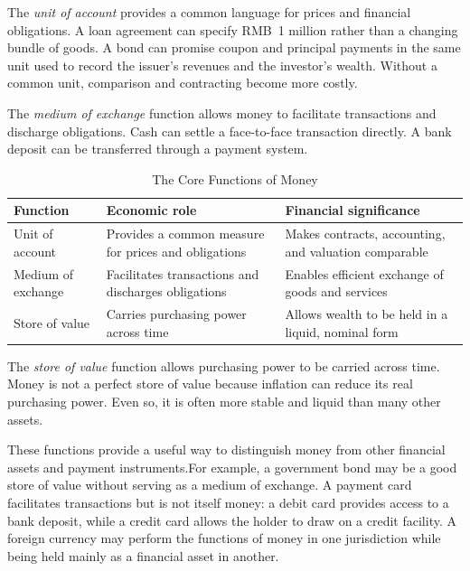 The \emph{unit of account} provides a common language for prices and financial obligations. A loan agreement can specify RMB~1 million rather than a changing bundle of goods. A bond can promise coupon and principal payments in the same unit used to record the issuer's revenues and the investor's wealth. Without a common unit, comparison and contracting become more costly.

The \emph{medium of exchange} function allows money to facilitate transactions and discharge obligations. Cash can settle a face-to-face transaction directly. A bank deposit can be transferred through a payment system. 


\begin{table}[H]
\centering
\caption{The Core Functions of Money}
\label{tab:ch2-money-functions}
\renewcommand{\arraystretch}{1.4}
\begin{tabularx}{\textwidth}{
    @{}
    >{\raggedright\arraybackslash}p{3.0cm}
    >{\raggedright\arraybackslash}X
    >{\raggedright\arraybackslash}X
    @{}
}
\toprule
\textbf{Function}
& \textbf{Economic role}
& \textbf{Financial significance} \\
\midrule

Unit of account
& Provides a common measure for prices and obligations
& Makes contracts, accounting, and valuation comparable \\

Medium of exchange
& Facilitates transactions and discharges obligations
& Enables efficient exchange of goods and services \\

Store of value
& Carries purchasing power across time
& Allows wealth to be held in a liquid, nominal form \\

\bottomrule
\end{tabularx}
\end{table}

The \emph{store of value} function allows purchasing power to be carried across time. Money is not a perfect store of value because inflation can reduce its real purchasing power. Even so, it is often more stable and liquid than many other assets. 

These functions provide a useful way to distinguish money from other financial assets and payment instruments.For example, a government bond may be a good store of value without serving as a medium of exchange. A payment card facilitates transactions but is not itself money: a debit card provides access to a bank deposit, while a credit card allows the holder to draw on a credit facility. A foreign currency may perform the functions of money in one jurisdiction while being held mainly as a financial asset in another.


